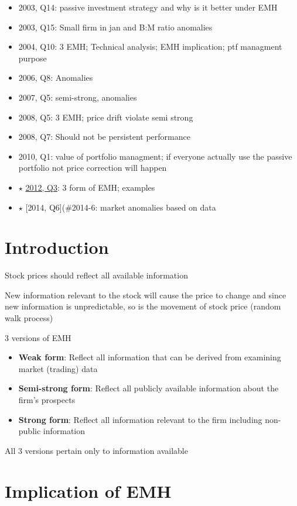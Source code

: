 \documentclass[]{book}
\providecommand{\tightlist}{%
  \setlength{\itemsep}{0pt}\setlength{\parskip}{0pt}}
\theoremstyle{definition}
\theoremstyle{definition}
\theoremstyle{remark}
\begin{document}
\begin{itemize}
\tightlist
\item
  2003, Q14: passive investment strategy and why is it better under EMH
\item
  2003, Q15: Small firm in jan and B:M ratio anomalies
\item
  2004, Q10: 3 EMH; Technical analysis; EMH implication; ptf managment
  purpose
\item
  2006, Q8: Anomalies
\item
  2007, Q5: semi-strong, anomalies
\item
  2008, Q5: 3 EMH; price drift violate semi strong
\item
  2008, Q7: Should not be persistent performance
\item
  2010, Q1: value of portfolio managment; if everyone actually use the
  passive portfolio not price correction will happen
\item
  \(\star\) \protect\hyperlink{2012-3}{2012, Q3}: 3 form of EMH;
  examples
\item
  \(\star\) {[}2014, Q6{]}(\#2014-6: market anomalies based on data
\end{itemize}

\section{Introduction}\label{introduction-2}

Stock prices should reflect all available information

New information relevant to the stock will cause the price to change and
since new information is unpredictable, so is the movement of stock
price (random walk process)

 3 versions of EMH

\begin{itemize}
\item
  \textbf{Weak form}: Reflect all information that can be derived from
  examining market (trading) data
\item
  \textbf{Semi-strong form}: Reflect all publicly available information
  about the firm's prospects
\item
  \textbf{Strong form}: Reflect all information relevant to the firm
  including non-public information
\end{itemize}

All 3 versions pertain only to information available

\section{Implication of EMH}\label{implication-of-emh}
\end{document}
